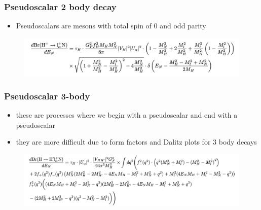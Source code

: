 \documentclass[
	11pt, %
]{beamer}
\begin{document}
\begin{frame}

\frametitle{Pseudoscalar 2 body decay}
\begin{itemize}
\item Pseudoscalars are mesons with total spin of 0 and odd parity
\end{itemize}
\begin{figure}
	\vspace*{2cm}
	 \hspace*{-0cm}
	\includegraphics[scale=.4]{2bdy_pseudo}
	\vspace*{-1cm}
	 \hspace*{-0cm}
	\centering
\end{figure}
\end{frame}


\begin{frame}

\frametitle{Pseudoscalar 3-body}

\begin{itemize}
\item these are processes where we begin with a pseudoscalar and end with a pseudoscalar
\item they are more difficult due to form factors and Dalitz plots for 3 body decays
\end{itemize}
\begin{figure}
	\vspace*{0cm}
	 \hspace*{-0cm}
	\includegraphics[scale=.4]{pseudo_decay}
	\vspace*{-1cm}
	 \hspace*{-0cm}
	\centering
\end{figure}
\end{frame}
\end{document}
